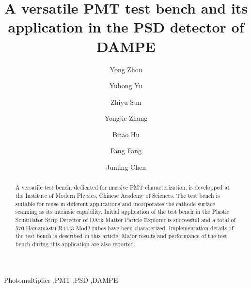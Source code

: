 \documentclass[5p, times]{elsarticle}
\begin{document}
\begin{frontmatter}

\title{A versatile PMT test bench and its application in the PSD detector of DAMPE}

\author[imp,lzu,ucas]{Yong Zhou}

\author[imp]{Yuhong Yu}

\author[imp]{Zhiyu Sun}

\author[imp]{Yongjie Zhang}
\author[lzu]{Bitao Hu}
\author[imp]{Fang Fang}
\author[imp]{Junling Chen}

\address[imp]{Institute of Modern Physicas, Chinese Academy of Sciences,  509 Nanchang Road,  Lanzhou,  730000,  P.R.China}
\address[lzu]{School of Nuclear Science and Technology,  Lanzhou University,  222 South Tianshui Road,  Lanzhou,  730000,  P.R.China}
\address[ucas]{Graduate University of the Chinese Academy of Sciences,  19A Yuquan Road,  Beijing,  100049,  P.R.China}

\begin{abstract}

A versatile test bench, dedicated for massive PMT characterization, is developped at the Institute of Modern Physics, Chinese Academy of Sciences.
The test bench is suitable for reuse in different applications and incorporates the cathode surface scanning as its intrinsic capability.
Initial application of the test bench in the Plastic Scintillator Strip Detector of DArk Matter Paricle Explorer is successfull and a total of 570 Hamamastu R4443 Mod2 tubes have been charaterized.
Implementation details of the test bench is described in this article.
Major results and performance of the test bench during this application are also reported. 
\end{abstract}

\begin{keyword}
Photomultiplier
\sep PMT
\sep PSD
\sep DAMPE



\end{keyword}

\end{frontmatter}
\end{document}
